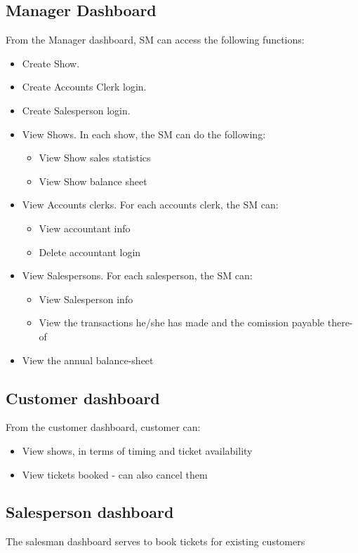\documentclass{scrreprt}
\begin{document}
\subsection{Manager Dashboard}
From the Manager dashboard, SM can access the following functions:
\begin{itemize}
\item Create Show.
\item Create Accounts Clerk login.
\item Create Salesperson login.
\item View Shows. In each show, the SM can do the following:
\begin{itemize}
\item View Show sales statistics
\item View Show balance sheet
\end{itemize}
\item View Accounts clerks. For each accounts clerk, the SM can:
\begin{itemize}
\item View accountant info
\item Delete accountant login
\end{itemize}
\item View Salespersons. For each salesperson, the SM can:
\begin{itemize}
\item View Salesperson info
\item View the transactions he/she has made and the comission payable there-of
\end{itemize}
\item View the annual balance-sheet
\end{itemize}

\subsection{Customer dashboard}
From the customer dashboard, customer can:
\begin{itemize}
\item View shows, in terms of timing and ticket availability
\item View tickets booked - can also cancel them
\end{itemize}

\subsection{Salesperson dashboard}
The salesman dashboard serves to book tickets for existing customers
\end{document}
